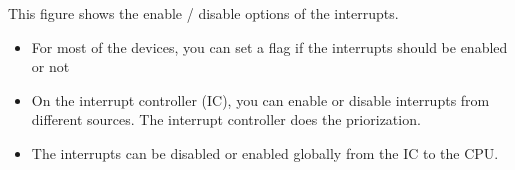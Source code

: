 This figure shows the enable / disable options of the interrupts.

\begin{itemize}
\tightlist
\item
  For most of the devices, you can set a flag if the interrupts should
  be enabled or not
\item
  On the interrupt controller (IC), you can enable or disable interrupts
  from different sources. The interrupt controller does the
  priorization.
\item
  The interrupts can be disabled or enabled globally from the IC to the
  CPU.
\end{itemize}

\clearpage